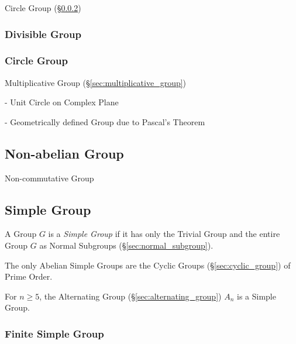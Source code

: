 Circle Group (\S\ref{sec:circle_group})



\subsubsection{Divisible Group}\label{sec:divisible_group}

\subsubsection{Circle Group}\label{sec:circle_group}

Multiplicative Group (\S\ref{sec:multiplicative_group})

- Unit Circle on Complex Plane

- Geometrically defined Group due to Pascal's Theorem
  \cite{lemmermeyer-shirali09}



\subsection{Non-abelian Group}\label{sec:noncommutative_group}

Non-commutative Group



\subsection{Simple Group}\label{sec:simple_group}

A Group $G$ is a \emph{Simple Group} if it has only the Trivial Group and the
entire Group $G$ as Normal Subgroups (\S\ref{sec:normal_subgroup}).

The only Abelian Simple Groups are the Cyclic Groups
(\S\ref{sec:cyclic_group}) of Prime Order.

For $n \geq 5$, the Alternating Group (\S\ref{sec:alternating_group})
$A_n$ is a Simple Group.



\subsubsection{Finite Simple Group}\label{sec:finite_simple_group}

